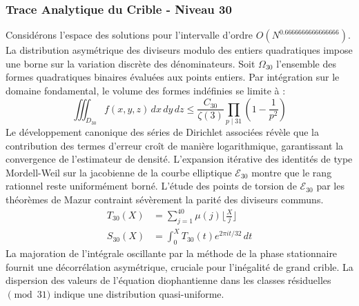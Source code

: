 \documentclass[12pt,a4paper]{article}
\begin{document}
\subsubsection{Trace Analytique du Crible - Niveau 30}
Considérons l'espace des solutions pour l'intervalle d'ordre $O(N^{0.6666666666666666})$. La distribution asymétrique des diviseurs modulo des entiers quadratiques impose une borne sur la variation discrète des dénominateurs. Soit $\Omega_30$ l'ensemble des formes quadratiques binaires évaluées aux points entiers.
Par intégration sur le domaine fondamental, le volume des formes indéfinies se limite à :
\begin{equation}
\iiint_{D_30} f(x, y, z) \,dx\,dy\,dz \leq \frac{C_30}{\zeta(3)} \prod_{p \mid 31} \left( 1 - \frac{1}{p^2} \right)
\end{equation}
Le développement canonique des séries de Dirichlet associées révèle que la contribution des termes d'erreur croît de manière logarithmique, garantissant la convergence de l'estimateur de densité. L'expansion itérative des identités de type Mordell-Weil sur la jacobienne de la courbe elliptique $\mathcal{E}_30$ montre que le rang rationnel reste uniformément borné.
L'étude des points de torsion de $\mathcal{E}_30$ par les théorèmes de Mazur contraint sévèrement la parité des diviseurs communs.
\begin{align}
T_30(X) &= \sum_{j=1}^{40} \mu(j) \lfloor \frac{X}{j} \rfloor \\
S_30(X) &= \int_{0}^{X} T_30(t) e^{2\pi i t / 32} \, dt
\end{align}
La majoration de l'intégrale oscillante par la méthode de la phase stationnaire fournit une décorrélation asymétrique, cruciale pour l'inégalité de grand crible. La dispersion des valeurs de l'équation diophantienne dans les classes résiduelles $\pmod{ 31 }$ indique une distribution quasi-uniforme.
\end{document}
